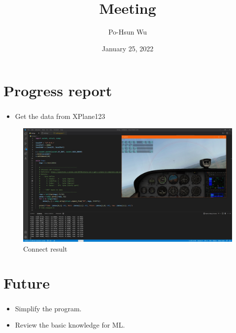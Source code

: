 \documentclass{beamer}
\date{January 25, 2022}
\title{Meeting}
\author{Po-Hsun Wu}
\begin{document}
    \frame{\titlepage}

    \section{Progress report}

    \begin{frame}
        \frametitle{\secname}
        \begin{itemize}
            \item Get the data from XPlane123
        \end{itemize}
        \begin{figure}
            \centering
            \includegraphics[scale=.2]{Figs/Result.JPG}
            \caption{Connect result}
        \end{figure}
    \end{frame}

    \section{Future}

    \begin{frame}
        \frametitle{\secname}
        \begin{itemize}
            \item Simplify the program.
            \item Review the basic knowledge for ML.
        \end{itemize}

    \end{frame}
\end{document}
